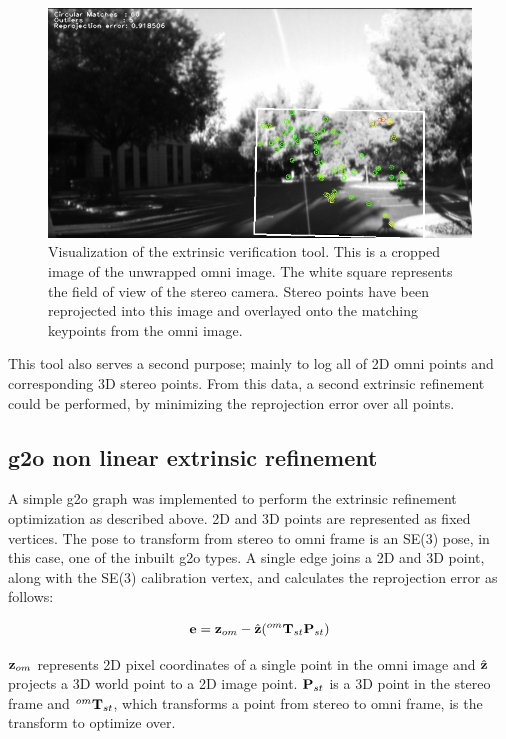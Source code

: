 \begin{figure}[h!]
  \centering
    \includegraphics[width=1.0\textwidth]{chapters/images/circ_matches}
  \caption{Visualization of the extrinsic verification tool. This is a cropped image of the unwrapped omni image.  The white square represents the field of view of the stereo camera.  Stereo points have been reprojected into this image and overlayed onto the matching keypoints from the omni image. }
  \label{fig:circ_matches}
\end{figure}

This tool also serves a second purpose; mainly to log all of 2D omni points and corresponding 3D stereo points.  From this data, a second extrinsic refinement could be performed, by minimizing the reprojection error over all points.

\subsection{g2o non linear extrinsic refinement}

A simple g2o graph was implemented to perform the extrinsic refinement optimization as described above.  2D and 3D points are represented as fixed vertices.  The pose to transform from stereo to omni frame is an SE(3) pose, in this case, one of the inbuilt g2o types.  A single edge joins a 2D and 3D point, along with the SE(3) calibration vertex, and calculates the reprojection error as follows:

\begin{align}
 \mathbf e = \mathbf z_{om} - \hat{\mathbf z}( ^{om}\mathbf T_{st} \mathbf P_{st})
\end{align}

$\mathbf z_{om}$ represents 2D pixel coordinates of a single point in the omni image and $\hat{\mathbf z}$ projects a 3D world point to a 2D image point.  $\mathbf P_{st}$ is a 3D point in the stereo frame and $^{om}\mathbf T_{st}$, which transforms a point from stereo to omni frame, is the transform to optimize over.

